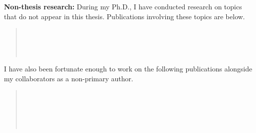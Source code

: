 \noindent
\textbf{Non-thesis research:}
During my Ph.D., I have conducted research on topics that do not appear in this thesis. Publications involving these topics are below. 

\begin{leftbar}
\begin{quote}%
  \citep{tracy2020}  \\[5mm]
  \citep{tracy2021}  \\[5mm]
  \citep{tracy2022f}  \\[5mm]
  \citep{tracy2022}  
\end{quote}
\end{leftbar}

\vspace{7mm}
\noindent
I have also been fortunate enough to work on the following publications alongside my collaborators as a non-primary author.

\begin{leftbar}
\begin{quote}%
   \\[5mm]
   \\[5mm]
   \\[5mm]
   \\[5mm]
\end{quote}
\end{leftbar}



